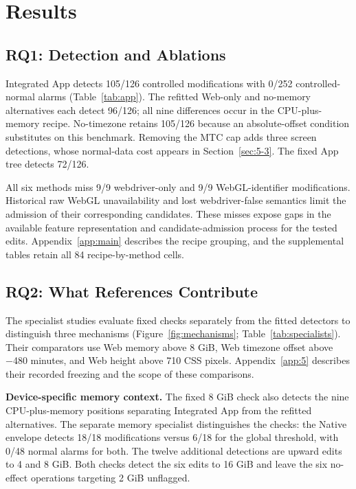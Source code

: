 \hypertarget{sec:5}{%
\section{Results}\label{sec:5}}

\hypertarget{sec:5-1}{%
\subsection{RQ1: Detection and Ablations}\label{sec:5-1}}

Integrated App detects 105/126 controlled modifications with 0/252 controlled-normal alarms (Table~\ref{tab:app}). The refitted Web-only and no-memory alternatives each detect 96/126; all nine differences occur in the CPU-plus-memory recipe. No-timezone retains 105/126 because an absolute-offset condition substitutes on this benchmark. Removing the MTC cap adds three screen detections, whose normal-data cost appears in Section~\ref{sec:5-3}. The fixed App tree detects 72/126.

\ifHGMatrix\else

\fi


All six methods miss 9/9 webdriver-only and 9/9 WebGL-identifier modifications. Historical raw WebGL unavailability and lost webdriver-false semantics limit the admission of their corresponding candidates. These misses expose gaps in the available feature representation and candidate-admission process for the tested edits. Appendix~\ref{app:main} describes the recipe grouping, and the supplemental tables retain all 84 recipe-by-method cells.



\hypertarget{sec:5-2}{%
\subsection{RQ2: What References Contribute}\label{sec:5-2}}

The specialist studies evaluate fixed checks separately from the fitted detectors to distinguish three mechanisms (Figure~\ref{fig:mechanisms}; Table~\ref{tab:specialists}). Their comparators use Web memory above 8 GiB, Web timezone offset above −480 minutes, and Web height above 710 CSS pixels. Appendix~\ref{app:5} describes their recorded freezing and the scope of these comparisons.

\textbf{Device-specific memory context.} The fixed 8 GiB check also detects the nine CPU-plus-memory positions separating Integrated App from the refitted alternatives. The separate memory specialist distinguishes the checks: the Native envelope detects 18/18 modifications versus 6/18 for the global threshold, with 0/48 normal alarms for both. The twelve additional detections are upward edits to 4 and 8 GiB. Both checks detect the six edits to 16 GiB and leave the six no-effect operations targeting 2 GiB unflagged.

